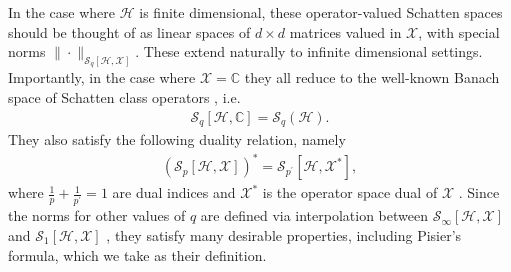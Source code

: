 \documentclass[11pt]{article}
\newcommand{\jk}[1]{\textcolor{cyan}{JK:~#1}}
\newcommand{\1}{\ensuremath{\mathbbm{1}}}
\theoremstyle{newdefinition}
\theoremstyle{newplain}
\theoremstyle{myplain}
\begin{document}
In the case where $\mathcal{H}$ is finite dimensional, these operator-valued Schatten spaces should be thought of as linear spaces of $d\times d$ matrices valued in $\mathcal{X}$, with special norms $\|\cdot\|_{\mathcal{S}_q[\mathcal{H},\mathcal{X}]}$. These extend naturally to  infinite dimensional settings.
Importantly, in the case where $\mathcal{X}=\mathbb{C}$ they all reduce to the well-known Banach space of Schatten class operators \cite{Beigi.2023}, i.e.
\begin{align}
   \mathcal{S}_q[\mathcal{H},\mathbb{C}]= \mathcal{S}_q(\mathcal{H}).
\end{align} 
They also satisfy the following duality relation, namely
\begin{align}
   \left( \mathcal{S}_p[\mathcal{H},\mathcal{X}]\right)^* = \mathcal{S}_{p^\prime}[\mathcal{H},\mathcal{X}^*],
\end{align} where $\frac{1}{p}+\frac{1}{p^\prime}=1$ are dual indices and $\mathcal{X}^*$ is the operator space dual of $\mathcal{X}$ \cite{Book.Pisier.2003}.
Since the norms for other values of $q$ are defined via interpolation between $\mathcal{S}_\infty[\mathcal{H},\mathcal{X}]$ and $\mathcal{S}_1[\mathcal{H},\mathcal{X}]$ \cite{Book.Pisier.1998}, they satisfy many desirable properties, including Pisier's formula, which we take as their definition. 




\end{document}

